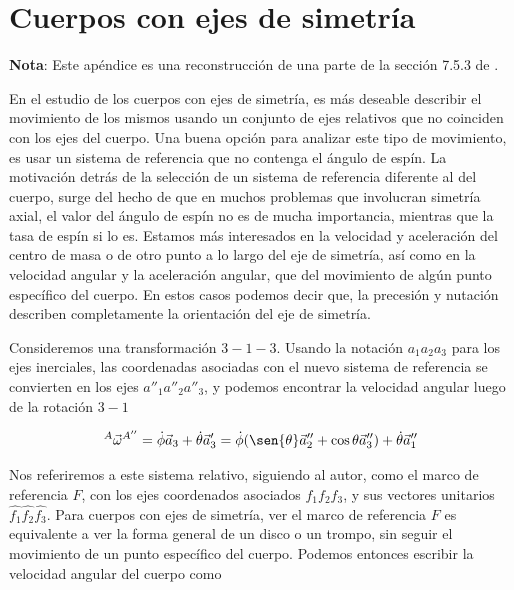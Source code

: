 \documentclass[a4paper,10pt]{article}
\numberwithin{equation}{section}
\begin{document}
\newpage

\section{Cuerpos con ejes de simetría} \label{app:apendice3}

\textbf{Nota}: Este apéndice es una reconstrucción de una parte de la sección 7.5.3 
de \cite{baruh}.

\vspace{.3cm}

En el estudio de los cuerpos con ejes de simetría, es más deseable describir el 
movimiento de los mismos usando un conjunto de ejes relativos que no coinciden con 
los ejes del cuerpo. Una buena opción para analizar este tipo de movimiento, 
es usar un sistema de referencia que no contenga el ángulo de espín. La motivación 
detrás de la selección de un sistema de referencia diferente al del cuerpo, 
surge del hecho de que en muchos problemas que involucran simetría axial, 
el valor del ángulo de espín no es de mucha importancia, mientras que la tasa de 
espín si lo es. Estamos más interesados en la velocidad y aceleración del centro 
de masa o de otro punto a lo largo del eje de simetría, así como en la velocidad
angular y la aceleración angular, que del movimiento de algún punto específico del 
cuerpo. En estos casos podemos decir que, la precesión y nutación describen completamente 
la orientación del eje de simetría.

\vspace{.3cm}

Consideremos una transformación $3-1-3$. Usando la notación $a_1a_2a_3$ para los 
ejes inerciales, las coordenadas asociadas con el nuevo sistema de referencia se 
convierten en los ejes $a''_1a''_2a''_3$, y podemos encontrar la velocidad angular 
luego de la rotación $3-1$ 

\begin{equation}
 {^A}{ \vec{\omega}}^{A''} = \dot{\phi}\vec{a}_3 + \dot{\theta}\vec{a}'_3 = 
 \dot{\phi}(\sen{\theta}\vec{a}''_2 + \cos{\theta}\vec{a}''_3) + \dot{\theta}\vec{a}''_1
\label{eq:velAngFframe1}
\end{equation}

Nos referiremos a este sistema relativo, siguiendo al autor, como el marco de referencia 
$F$, con los ejes coordenados asociados $f_1f_2f_3$, y sus vectores unitarios 
$\hat{f_1}\hat{f_2}\hat{f_3}$. Para cuerpos con ejes de simetría, ver el marco de 
referencia $F$ es equivalente a ver la forma general de un disco o un trompo, sin 
seguir el movimiento de un punto específico del cuerpo. Podemos entonces escribir 
la velocidad angular del cuerpo como 
\end{document}
